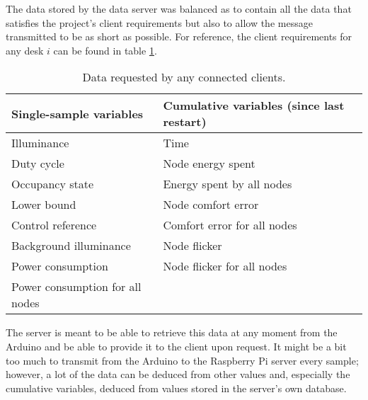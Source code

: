 \documentclass[english,fira]{ist-report}
\begin{document}
The data stored by the data server was balanced as to contain all the data that satisfies the project's client requirements but also to allow the message transmitted to be as short as possible. For reference, the client requirements for any desk $i$ can be found in table \ref{tab:client}.
\begin{table}[ht]
    \centering
    \begin{tabular}{l l}\toprule
        \textbf{Single-sample variables}        & \textbf{Cumulative variables (since last restart)} \\
        \midrule
        Illuminance                     & Time                          \\
        Duty cycle                      & Node energy spent             \\
        Occupancy state                 & Energy spent by all nodes     \\
        Lower bound                     & Node comfort error            \\
        Control reference               & Comfort error for all nodes   \\
        Background illuminance          & Node flicker                  \\
        Power consumption               & Node flicker for all nodes    \\
        Power consumption for all nodes &                               \\
        \bottomrule
    \end{tabular}
    \caption{Data requested by any connected clients.}
    \label{tab:client}
\end{table}

The server is meant to be able to retrieve this data at any moment from the Arduino and be able to provide it to the client upon request. It might be a bit too much to transmit from the Arduino to the Raspberry Pi server every sample; however, a lot of the data can be deduced from other values and, especially the cumulative variables, deduced from values stored in the server's own database.
\end{document}
